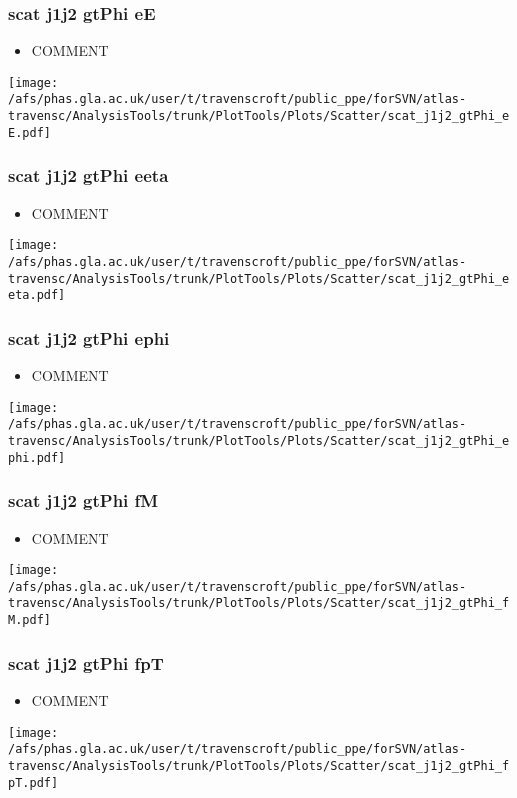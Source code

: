 \documentclass{beamer}
\begin{document}
\begin{frame}
\frametitle{scat j1j2 gtPhi eE}
\begin{itemize}
\item COMMENT
\end{itemize}
\begin{center}
\texttt{[image: /afs/phas.gla.ac.uk/user/t/travenscroft/public\_ppe/forSVN/atlas-travensc/AnalysisTools/trunk/PlotTools/Plots/Scatter/scat\_j1j2\_gtPhi\_eE.pdf]}
\end{center}
\end{frame}

\begin{frame}
\frametitle{scat j1j2 gtPhi eeta}
\begin{itemize}
\item COMMENT
\end{itemize}
\begin{center}
\texttt{[image: /afs/phas.gla.ac.uk/user/t/travenscroft/public\_ppe/forSVN/atlas-travensc/AnalysisTools/trunk/PlotTools/Plots/Scatter/scat\_j1j2\_gtPhi\_eeta.pdf]}
\end{center}
\end{frame}

\begin{frame}
\frametitle{scat j1j2 gtPhi ephi}
\begin{itemize}
\item COMMENT
\end{itemize}
\begin{center}
\texttt{[image: /afs/phas.gla.ac.uk/user/t/travenscroft/public\_ppe/forSVN/atlas-travensc/AnalysisTools/trunk/PlotTools/Plots/Scatter/scat\_j1j2\_gtPhi\_ephi.pdf]}
\end{center}
\end{frame}

\begin{frame}
\frametitle{scat j1j2 gtPhi fM}
\begin{itemize}
\item COMMENT
\end{itemize}
\begin{center}
\texttt{[image: /afs/phas.gla.ac.uk/user/t/travenscroft/public\_ppe/forSVN/atlas-travensc/AnalysisTools/trunk/PlotTools/Plots/Scatter/scat\_j1j2\_gtPhi\_fM.pdf]}
\end{center}
\end{frame}

\begin{frame}
\frametitle{scat j1j2 gtPhi fpT}
\begin{itemize}
\item COMMENT
\end{itemize}
\begin{center}
\texttt{[image: /afs/phas.gla.ac.uk/user/t/travenscroft/public\_ppe/forSVN/atlas-travensc/AnalysisTools/trunk/PlotTools/Plots/Scatter/scat\_j1j2\_gtPhi\_fpT.pdf]}
\end{center}
\end{frame}
\end{document}
